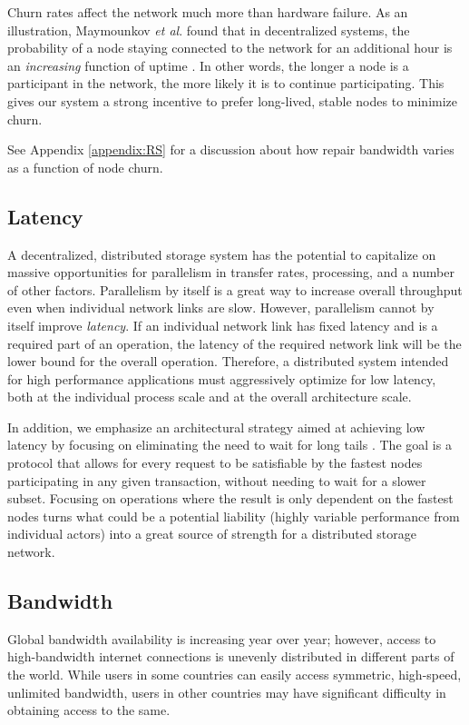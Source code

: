 \documentclass[a4paper,10pt]{article} \usepackage[utf8]{inputenc}
\begin{document}
Churn rates affect the network much more than hardware failure. As an
illustration, Maymounkov {\em et al}. found that in
decentralized systems, the probability of a node staying connected to the
network for an additional hour is an {\em increasing}
function of uptime \cite{kad}. In other words, the longer a node is a
participant in the network, the more likely it is to continue
participating. This gives our system a strong incentive to prefer long-lived,
stable nodes to minimize churn.

See Appendix \ref{appendix:RS} for a discussion about how repair bandwidth
varies as a function of node churn.

\subsection{Latency}

A decentralized, distributed storage system has the potential to capitalize on
massive opportunities for parallelism in transfer rates, processing,
and a number of other factors. Parallelism by
itself is a great way to increase overall throughput even when individual
network links are slow. However, parallelism cannot by itself improve {\em
latency}. If an individual network link has fixed latency and is a required part
of an operation, the latency of the required network link will be the lower
bound for the overall operation.
Therefore, a distributed system
intended for high performance applications must aggressively optimize for low
latency, both at the individual process scale and at the overall architecture
scale.

In addition, we emphasize an architectural strategy aimed at achieving low
latency by focusing on eliminating the need to wait for long tails
\cite{tail-at-scale}.
The goal is a protocol that allows for every request to be satisfiable by the
fastest nodes participating in any given transaction, without needing to wait
for a slower subset.
Focusing on operations where the result is only dependent on the fastest
nodes turns what could be a potential liability (highly variable performance
from individual actors) into a great source of strength for a distributed
storage network.

\subsection{Bandwidth}

Global bandwidth availability is increasing year over year; however, access to
high-bandwidth internet connections is unevenly distributed in different
parts of the world.
While users in some
countries can easily access symmetric, high-speed, unlimited bandwidth, users in
other countries may have significant difficulty in obtaining access to the same.
\end{document}
